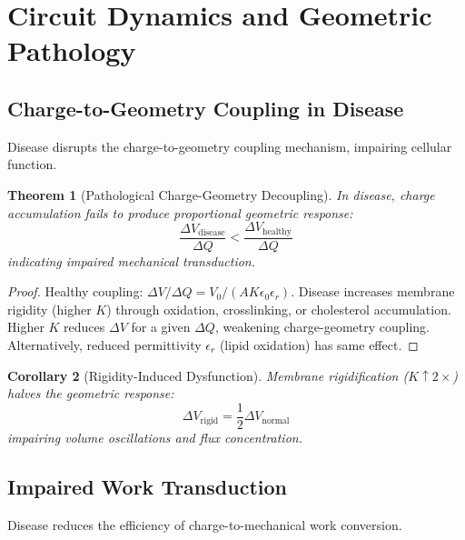 \documentclass[11pt,twocolumn,a4paper]{article}
\newtheorem{theorem}{Theorem}[section]
\newtheorem{corollary}[theorem]{Corollary}
\theoremstyle{definition}
\theoremstyle{remark}
\begin{document}
\section{Circuit Dynamics and Geometric Pathology}
\label{sec:circuit_dynamics}

\subsection{Charge-to-Geometry Coupling in Disease}

Disease disrupts the charge-to-geometry coupling mechanism, impairing cellular function.

\begin{theorem}[Pathological Charge-Geometry Decoupling]
\label{thm:pathological_decoupling}
In disease, charge accumulation fails to produce proportional geometric response:
\begin{equation}
\frac{\Delta V_{\text{disease}}}{\Delta Q} < \frac{\Delta V_{\text{healthy}}}{\Delta Q}
\end{equation}
indicating impaired mechanical transduction.
\end{theorem}

\begin{proof}
Healthy coupling: $\Delta V/\Delta Q = V_0/(A K \epsilon_0 \epsilon_r)$. Disease increases membrane rigidity (higher $K$) through oxidation, crosslinking, or cholesterol accumulation. Higher $K$ reduces $\Delta V$ for a given $\Delta Q$, weakening charge-geometry coupling. Alternatively, reduced permittivity $\epsilon_r$ (lipid oxidation) has same effect.
\end{proof}

\begin{corollary}[Rigidity-Induced Dysfunction]
\label{cor:rigidity_dysfunction}
Membrane rigidification ($K \uparrow 2\times$) halves the geometric response:
\begin{equation}
\Delta V_{\text{rigid}} = \frac{1}{2} \Delta V_{\text{normal}}
\end{equation}
impairing volume oscillations and flux concentration.
\end{corollary}

\subsection{Impaired Work Transduction}

Disease reduces the efficiency of charge-to-mechanical work conversion.
\end{document}
